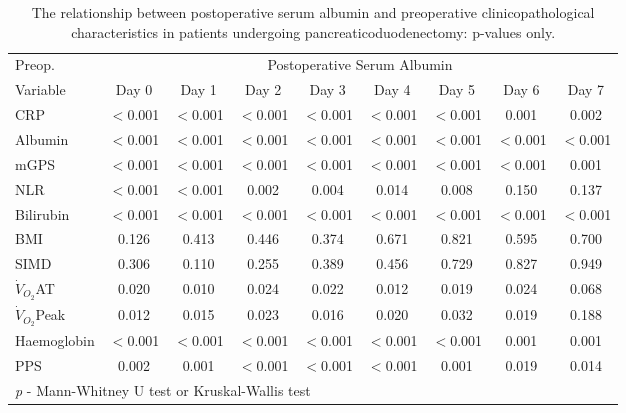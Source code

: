 \begin{sidewaystable}[p]
	\caption{The relationship  between postoperative serum albumin and preoperative clinicopathological characteristics in patients undergoing pancreaticoduodenectomy: p-values only. }
	\label{table:sirs_alb_pvalues}
	\centering
	\renewcommand{\arraystretch}{1.2} %
	\begin{tabular}{|l | c c c c c c c c|}
		\hline
		Preop.              &                   \multicolumn{8}{c|}{Postoperative Serum Albumin}                    \\
		Variable            & Day 0    & Day 1    & Day 2    & Day 3    & Day 4    & Day 5    & Day 6    & Day 7    \\ \hline
		CRP                 & $<$0.001 & $<$0.001 & $<$0.001 & $<$0.001 & $<$0.001 & $<$0.001 & 0.001    & 0.002    \\
		Albumin             & $<$0.001 & $<$0.001 & $<$0.001 & $<$0.001 & $<$0.001 & $<$0.001 & $<$0.001 & $<$0.001 \\
		mGPS                & $<$0.001 & $<$0.001 & $<$0.001 & $<$0.001 & $<$0.001 & $<$0.001 & $<$0.001 & 0.001    \\
		NLR                 & $<$0.001 & $<$0.001 & 0.002    & 0.004    & 0.014    & 0.008    & 0.150    & 0.137    \\
		Bilirubin           & $<$0.001 & $<$0.001 & $<$0.001 & $<$0.001 & $<$0.001 & $<$0.001 & $<$0.001 & $<$0.001 \\
		BMI                 & 0.126    & 0.413    & 0.446    & 0.374    & 0.671    & 0.821    & 0.595    & 0.700    \\
		SIMD                & 0.306    & 0.110    & 0.255    & 0.389    & 0.456    & 0.729    & 0.827    & 0.949    \\
		$\dot{V}_{O_2}$AT   & 0.020    & 0.010    & 0.024    & 0.022    & 0.012    & 0.019    & 0.024    & 0.068    \\
		$\dot{V}_{O_2}$Peak & 0.012    & 0.015    & 0.023    & 0.016    & 0.020    & 0.032    & 0.019    & 0.188    \\
		Haemoglobin         & $<$0.001 & $<$0.001 & $<$0.001 & $<$0.001 & $<$0.001 & $<$0.001 & 0.001    & 0.001    \\
		PPS                 & 0.002    & 0.001    & $<$0.001 & $<$0.001 & $<$0.001 & 0.001    & 0.019    & 0.014    \\ \hline
		\multicolumn{9}{l}{\textit{p} - Mann-Whitney U test or Kruskal-Wallis test}
	\end{tabular}
\end{sidewaystable}